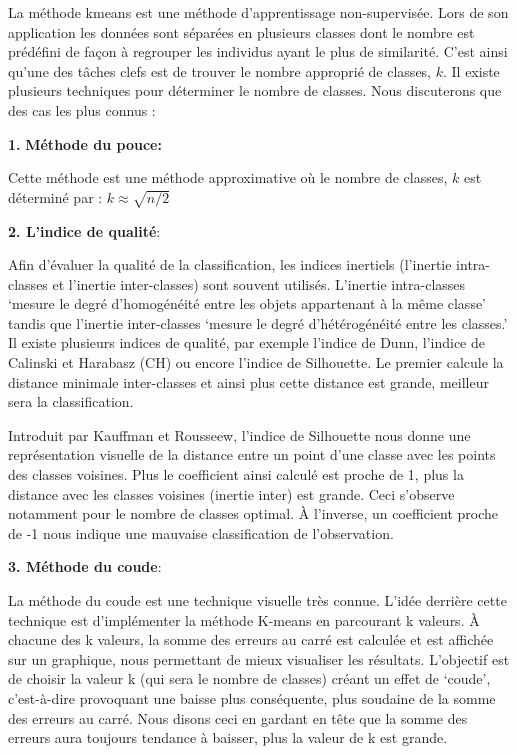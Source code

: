 \documentclass[12pt,a4paper]{book}
\newcommand{\1}{\mathds{1}}
\begin{document}
\noindent
La méthode kmeans est une méthode d'apprentissage non-supervisée. Lors de son application les données sont séparées en plusieurs classes dont le nombre est prédéfini de façon à regrouper les individus ayant le plus de similarité. C'est ainsi qu'une des tâches clefs est de trouver le nombre approprié de classes, $k$. Il existe plusieurs techniques pour déterminer le nombre de classes. Nous discuterons que des cas les plus connus : 
\vspace{5 mm}
\begin{description}
  \item \textbf{1.} \textbf{Méthode du pouce:}
  
  Cette méthode est une méthode approximative où le nombre de classes, $k$ est déterminé par : 
$ k \approx \sqrt{n/2}$

\vspace{5 mm}
    \item \textbf{2. L'indice de qualité}:
    
	Afin d'évaluer la qualité de la classification, les indices inertiels (l’inertie intra-classes et l’inertie inter-classes) sont souvent utilisés. L'inertie intra-classes ‘mesure le degré d’homogénéité entre les objets appartenant à la même classe' tandis que l’inertie inter-classes ‘mesure le degré d’hétérogénéité entre les classes.’
Il existe plusieurs indices de qualité, par exemple l’indice de Dunn, l’indice de Calinski et Harabasz (CH) ou encore l’indice de Silhouette. 
Le premier calcule la distance minimale inter-classes et ainsi plus cette distance est grande, meilleur sera la classification. 

\vspace{5 mm}
Introduit par Kauffman et Rousseew, l’indice de Silhouette nous donne une représentation visuelle de la distance entre un point d’une classe avec les points des classes voisines. Plus le coefficient ainsi calculé est proche de 1, plus la distance avec les classes voisines (inertie inter) est grande. Ceci s'observe notamment pour le nombre de classes optimal. À l'inverse, un coefficient proche de -1 nous indique une mauvaise classification de l’observation.

\vspace{5 mm}
		\item \textbf{3. Méthode du coude}:
		
  La méthode du coude est une technique visuelle très connue. L’idée derrière cette technique est d’implémenter la méthode K-means en parcourant k valeurs. À chacune des k valeurs, la somme des erreurs au carré est calculée et est affichée sur un graphique, nous permettant de mieux visualiser les résultats. L’objectif est de choisir la valeur k (qui sera le nombre de classes) créant un effet de ‘coude’, c’est-à-dire provoquant une baisse plus conséquente, plus soudaine de la somme des erreurs au carré. Nous disons ceci en gardant en tête que la somme des erreurs aura toujours tendance à baisser, plus la valeur de k est grande. 


\end{description}
\end{document}
